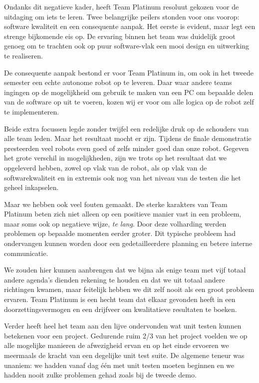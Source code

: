 \documentclass[12pt,a4paper]{report}
\begin{document}
Ondanks dit negatieve kader, heeft Team Platinum resoluut gekozen voor de uitdaging om iets te leren. Twee belangrijke peilers stonden voor ons voorop: software kwaliteit en een consequente aanpak. Het eerste is evident, maar legt een strenge bijkomende eis op. De ervaring binnen het team was duidelijk groot genoeg om te trachten ook op puur software-vlak een mooi design en uitwerking te realiseren.

De consequente aanpak bestond er voor Team Platinum in, om ook in het tweede semester een echte autonome robot op te leveren. Daar waar andere teams ingingen op de mogelijkheid om gebruik te maken van een PC om bepaalde delen van de software op uit te voeren, kozen wij er voor om alle logica op de robot zelf te implementeren.

Beide extra focussen legde zonder twijfel een redelijke druk op de schouders van alle team leden. Maar het resultaat mocht er zijn. Tijdens de finale demonstratie presteerden veel robots even goed of zelfs minder goed dan onze robot. Gegeven het grote verschil in mogelijkheden, zijn we trots op het resultaat dat we opgeleverd hebben, zowel op vlak van de robot, als op vlak van de softwarekwaliteit en in extremis ook nog van het niveau van de testen die het geheel inkapselen.

Maar we hebben ook veel fouten gemaakt. De sterke karakters van Team Platinum beten zich niet alleen op een positieve manier vast in een probleem, maar soms ook op negatieve wijze, \emph{te lang}. Door deze volharding werden problemen op bepaalde momenten eerder groter. Dit typische probleem had ondervangen kunnen worden door een gedetailleerdere planning en betere interne communicatie.

We zouden hier kunnen aanbrengen dat we bijna als enige team met vijf totaal andere agenda's dienden rekening te houden en dat we uit totaal andere richtingen kwamen, maar feitelijk hebben we dit zelf nooit als een groot probleem ervaren. Team Platinum is een hecht team dat elkaar gevonden heeft in een doorzettingsvermogen en een drijfveer om kwalitatieve resultaten te boeken.

Verder heeft heel het team aan den lijve ondervonden wat unit testen kunnen betekenen voor een project. Gedurende ruim 2/3 van het project voelden we op alle mogelijke manieren de afwezigheid ervan en op het einde ervoeren we meermaals de kracht van een degelijke unit test suite. De algemene teneur was unaniem: we hadden vanaf dag \'e\'en met unit testen moeten beginnen en we hadden nooit zulke problemen gehad zoals bij de tweede demo.
\end{document}
